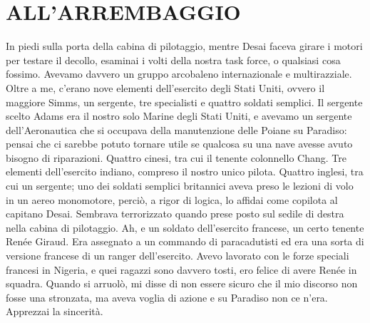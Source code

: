 \chapter{ALL'ARREMBAGGIO}\label{allarrembaggio}

\hfill\break

In piedi sulla porta della cabina di pilotaggio, mentre Desai faceva
girare i motori per testare il decollo, esaminai i volti della nostra
task force, o qualsiasi cosa fossimo. Avevamo davvero un gruppo
arcobaleno internazionale e multirazziale. Oltre a me, c'erano nove
elementi dell'esercito degli Stati Uniti, ovvero il maggiore Simms, un
sergente, tre specialisti e quattro soldati semplici. Il sergente scelto
Adams era il nostro solo Marine degli Stati Uniti, e avevamo un sergente
dell'Aeronautica che si occupava della manutenzione delle Poiane su
Paradiso: pensai che ci sarebbe potuto tornare utile se qualcosa su una
nave avesse avuto bisogno di riparazioni. Quattro cinesi, tra cui il
tenente colonnello Chang. Tre elementi dell'esercito indiano, compreso
il nostro unico pilota. Quattro inglesi, tra cui un sergente; uno dei
soldati semplici britannici aveva preso le lezioni di volo in un aereo
monomotore, perciò, a rigor di logica, lo affidai come copilota al
capitano Desai. Sembrava terrorizzato quando prese posto sul sedile di
destra nella cabina di pilotaggio. Ah, e un soldato dell'esercito
francese, un certo tenente Renée Giraud. Era assegnato a un commando di
paracadutisti ed era una sorta di versione francese di un ranger
dell'esercito. Avevo lavorato con le forze speciali francesi in Nigeria,
e quei ragazzi sono davvero tosti, ero felice di avere Renée in squadra.
Quando si arruolò, mi disse di non essere sicuro che il mio discorso non
fosse una stronzata, ma aveva voglia di azione e su Paradiso non ce
n'era. Apprezzai la sincerità.

